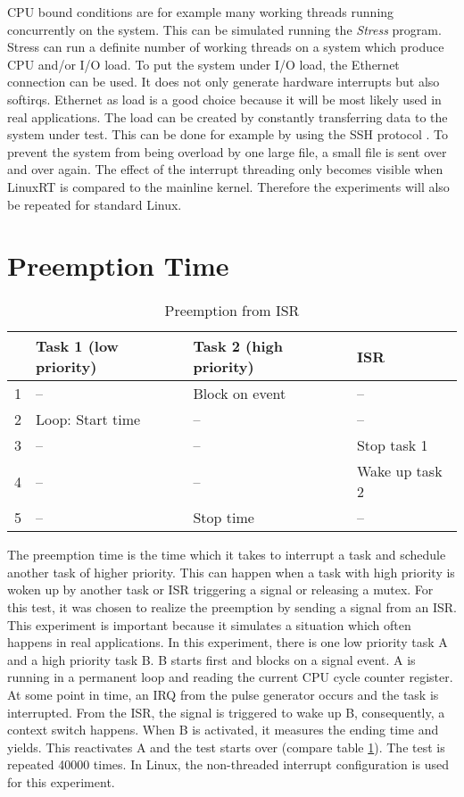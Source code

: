 \ac{CPU} bound conditions are for example many working threads running concurrently on the system.
This can be simulated running the \textit{Stress} \cite{stress} program.
Stress can run a definite number of working threads on a system which produce \ac{CPU} and/or \ac{I/O} load.
To put the system under \ac{I/O} load, the Ethernet connection can be used.
It does not only generate hardware interrupts but also softirqs.
Ethernet as load is a good choice because it will be most likely used in real applications.
The load can be created by constantly transferring data to the system under test.
This can be done for example by using the \ac{SSH} protocol \cite{tlip:tsspa}.
To prevent the system from being overload by one large file, a small file is sent over and over again. 
The effect of the interrupt threading only becomes visible when LinuxRT is compared to the mainline kernel.
Therefore the experiments will also be repeated for standard Linux.

\section{Preemption Time}
\begin{table}[htbp]
	\centering
		\begin{tabular}{|l|l|l|l|}
			\hline
				& Task 1 (low priority)& Task 2 (high priority)	& \ac{ISR}				\\
				\hline 
				1 & --									 & Block on event					& --							\\
			  2 & Loop: Start time		 & --											& --							\\
			  3 & --									 & --											& Stop task 1			\\
			  4 & --									 & --							 				& Wake up task 2	\\
			  5 & --									 & Stop time							& --							\\	  
			\hline
		\end{tabular}
	\caption{Preemption from ISR}
	\label{tab_preemption}
\end{table}

The preemption time is the time which it takes to interrupt a task and schedule another task of higher priority.
This can happen when a task with high priority is woken up by another task or \ac{ISR} triggering a signal or releasing a mutex.
For this test, it was chosen to realize the preemption by sending a signal from an \ac{ISR}.
This experiment is important because it simulates a situation which often happens in real applications.
In this experiment, there is one low priority task A and a high priority task B.
B starts first and blocks on a signal event.
A is running in a permanent loop and reading the current \ac{CPU} cycle counter register.
At some point in time, an \ac{IRQ} from the pulse generator occurs and the task is interrupted.
From the \ac{ISR}, the signal is triggered to wake up B, consequently, a context switch happens.
When B is activated, it measures the ending time and yields.
This reactivates A and the test starts over (compare table \ref{tab_preemption}).
The test is repeated 40000 times.
In Linux, the non-threaded interrupt configuration is used for this experiment. 

